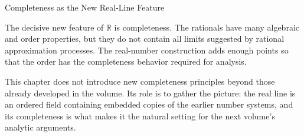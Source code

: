 \label{sec:real-line-completeness-feature}

\begin{topicbox}{Completeness as the New Real-Line Feature}
\begin{exposition}
The decisive new feature of \(\mathbb R\) is completeness. The rationals have
many algebraic and order properties, but they do not contain all limits
suggested by rational approximation processes. The real-number construction
adds enough points so that the order has the completeness behavior required
for analysis.
\end{exposition}

\begin{exposition}
This chapter does not introduce new completeness principles beyond those
already developed in the volume. Its role is to gather the picture: the real
line is an ordered field containing embedded copies of the earlier number
systems, and its completeness is what makes it the natural setting for the
next volume's analytic arguments.
\end{exposition}
\end{topicbox}

